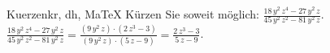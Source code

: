 \begin{MAufgabe}{Kuerzen}{kr, dh, MaTeX}
K\"urzen Sie soweit m\"oglich: $\frac{18\, y^2\, z^4 - 27\, y^2\, z}{45\, y^2\, z^2 - 81\, y^2\, z}$.\\ 
\ifLsg\MLoesung
\quad $\frac{18\, y^2\, z^4 - 27\, y^2\, z}{45\, y^2\, z^2 - 81\, y^2\, z}=\frac{(9\, y^2\, z)\cdot(2\, z^3 - 3)}{(9\, y^2\, z)\cdot(5\, z - 9)}=\frac{2\, z^3 - 3}{5\, z - 9}$.\else\relax\fi
 \end{MAufgabe}